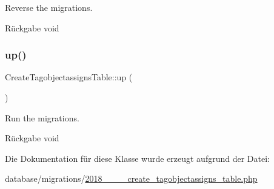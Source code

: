 Reverse the migrations.

\begin{DoxyReturn}{Rückgabe}
void 
\end{DoxyReturn}
\mbox{\label{classCreateTagobjectassignsTable_a08a1d748f8a2d14c425a7b1df518619c}} 
\subsubsection{\texorpdfstring{up()}{up()}}
{\footnotesize\ttfamily Create\+Tagobjectassigns\+Table\+::up (\begin{DoxyParamCaption}{ }\end{DoxyParamCaption})}

Run the migrations.

\begin{DoxyReturn}{Rückgabe}
void 
\end{DoxyReturn}


Die Dokumentation für diese Klasse wurde erzeugt aufgrund der Datei\+:\begin{DoxyCompactItemize}
\item 
database/migrations/\hyperlink{2018__06__19__120455__create__tagobjectassigns__table_8php}{2018\+\_\+\_\+\_\+\_\+create\+\_\+tagobjectassigns\+\_\+table.\+php}\end{DoxyCompactItemize}
